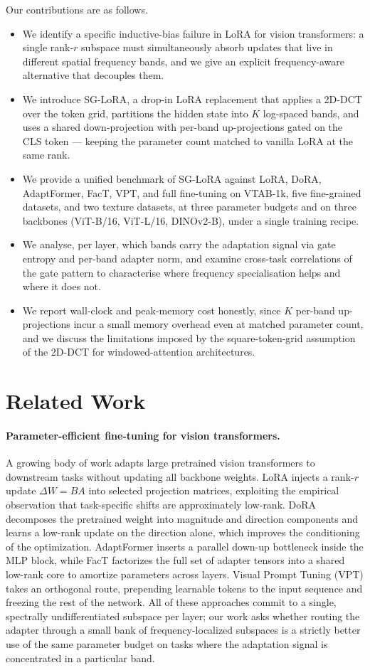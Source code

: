 \documentclass{article}
\begin{document}
Our contributions are as follows.
\begin{itemize}
    \item We identify a specific inductive-bias failure in LoRA for vision transformers: a single rank-$r$ subspace must simultaneously absorb updates that live in different spatial frequency bands, and we give an explicit frequency-aware alternative that decouples them.
    \item We introduce SG-LoRA, a drop-in LoRA replacement that applies a 2D-DCT over the token grid, partitions the hidden state into $K$ log-spaced bands, and uses a shared down-projection with per-band up-projections gated on the CLS token --- keeping the parameter count matched to vanilla LoRA at the same rank.
    \item We provide a unified benchmark of SG-LoRA against LoRA, DoRA, AdaptFormer, FacT, VPT, and full fine-tuning on VTAB-1k, five fine-grained datasets, and two texture datasets, at three parameter budgets and on three backbones (ViT-B/16, ViT-L/16, DINOv2-B), under a single training recipe.
    \item We analyse, per layer, which bands carry the adaptation signal via gate entropy and per-band adapter norm, and examine cross-task correlations of the gate pattern to characterise where frequency specialisation helps and where it does not.
    \item We report wall-clock and peak-memory cost honestly, since $K$ per-band up-projections incur a small memory overhead even at matched parameter count, and we discuss the limitations imposed by the square-token-grid assumption of the 2D-DCT for windowed-attention architectures.
\end{itemize}

\section{Related Work}
\paragraph{Parameter-efficient fine-tuning for vision transformers.}
A growing body of work adapts large pretrained vision transformers to downstream tasks without updating all backbone weights. LoRA injects a rank-$r$ update $\Delta W = BA$ into selected projection matrices, exploiting the empirical observation that task-specific shifts are approximately low-rank. DoRA decomposes the pretrained weight into magnitude and direction components and learns a low-rank update on the direction alone, which improves the conditioning of the optimization. AdaptFormer inserts a parallel down-up bottleneck inside the MLP block, while FacT factorizes the full set of adapter tensors into a shared low-rank core to amortize parameters across layers. Visual Prompt Tuning (VPT) takes an orthogonal route, prepending learnable tokens to the input sequence and freezing the rest of the network. All of these approaches commit to a single, spectrally undifferentiated subspace per layer; our work asks whether routing the adapter through a small bank of frequency-localized subspaces is a strictly better use of the same parameter budget on tasks where the adaptation signal is concentrated in a particular band.
\end{document}
